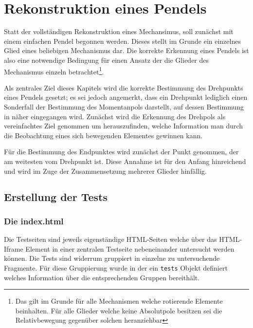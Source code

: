 \chapter{Rekonstruktion eines Pendels}

Statt der vollständigen Rekonstruktion eines Mechansimus, soll zunächst mit einem einfachen Pendel begonnen werden.
Dieses stellt im Grunde ein einzelnes Glied eines beliebigen Mechanismus dar.
Die korrekte Erkennung eines Pendels ist also eine notwendige Bedingung für einen Ansatz der die Glieder des Mechanismus einzeln betrachtet\footnote{Das gilt im Grunde für alle Mechanismen welche rotierende Elemente beinhalten. Für alle Glieder welche keine Absolutpole besitzen sei die Relativbewegung gegenüber solchen heranziehbar}.

Als zentrales Ziel dieses Kapitels wird die korrekte Bestimmung des Drehpunkts eines Pendels gesetzt; es sei jedoch angemerkt, dass ein Drehpunkt lediglich einen Sonderfall der Bestimmung des Momentanpols darstellt, auf dessen Bestimmung in %
näher eingegangen wird.
Zunächst wird die Erkennung des Drehpols als vereinfachtes Ziel genommen um herauszufinden, welche Information man durch die Beobachtung eines sich bewegenden Elementes gewinnen kann.

Für die Bestimmung des Endpunktes wird zunächst der Punkt genommen, der am weitesten vom Drehpunkt ist.
Diese Annahme ist für den Anfang hinreichend und wird im Zuge der Zusammensetzung mehrerer Glieder hinfällig. %

\section{Erstellung der Tests}

\subsection{Die index.html}

Die Testseiten sind jeweils eigenständige HTML-Seiten welche über das HTML-Iframe Element in einer zentralen Testseite nebeneinander untersucht werden können.
Die Tests sind widerrum gruppiert in einzelne zu untersuchende Fragmente.
Für diese Gruppierung wurde in der  ein \lstinline{tests} Objekt definiert welches Information über die entsprechenden Gruppen bereithält.

